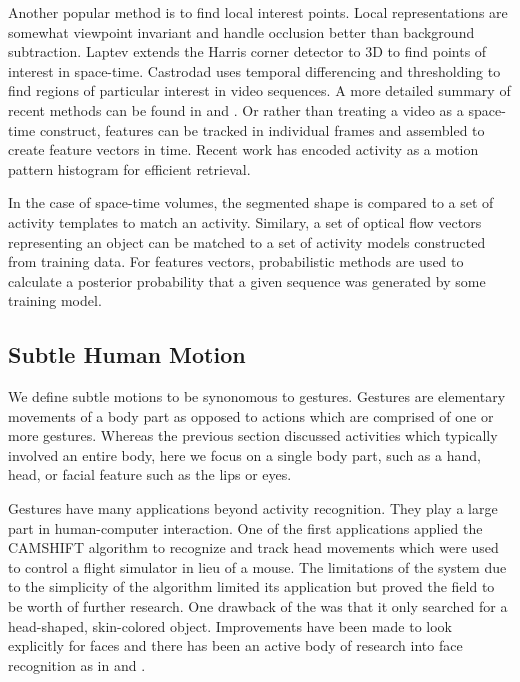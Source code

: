 \documentclass[11pt]{article}
\newcounter{list}
\begin{document}
Another popular method is to find local interest points. Local representations are somewhat viewpoint invariant and handle occlusion better than background subtraction. Laptev\cite{laptev2003} extends the Harris corner detector to 3D to find points of interest in space-time. Castrodad\cite{castrodad2012} uses temporal differencing and thresholding to find regions of particular interest in video sequences. A more detailed summary of recent methods can be found in \cite{poppe2010} and \cite{aggarwal2011}. Or rather than treating a video as a space-time construct, features can be tracked in individual frames and assembled to create feature vectors in time. Recent work\cite{ciptadi2014} has encoded activity as a motion pattern histogram for efficient retrieval.

In the case of space-time volumes, the segmented shape is compared to a set of activity templates to match an activity. Similary, a set of optical flow vectors representing an object can be matched to a set of activity models constructed from training data. For features vectors, probabilistic methods are used to calculate a posterior probability that a given sequence was generated by some training model.

\subsection{Subtle Human Motion}
We define subtle motions to be synonomous to gestures. Gestures are elementary movements of a body part as opposed to actions which are comprised of one or more gestures. Whereas the previous section discussed activities which typically involved an entire body, here we focus on a single body part, such as a hand, head, or facial feature such as the lips or eyes.

Gestures have many applications beyond activity recognition. They play a large part in human-computer interaction. One of the first applications\cite{bradski98} applied the CAMSHIFT algorithm to recognize and track head movements which were used to control a flight simulator in lieu of a mouse. The limitations of the system due to the simplicity of the algorithm limited its application but proved the field to be worth of further research. One drawback of the \cite{bradski98} was that it only searched for a head-shaped, skin-colored object. Improvements have been made to look explicitly for faces and there has been an active body of research into face recognition as in \cite{cech2014} and \cite{viola2004}.
\end{document}
